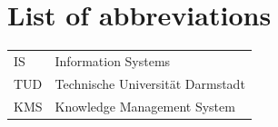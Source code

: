 \documentclass[
	english,
	ruledheaders=section,%
	class=report,%
	thesis={type=bachelor},%
	accentcolor=1b,%
	custommargins=true,%
	marginpar=false,%
	parskip=half-,%
	fontsize=11pt,%
	DIV=14,
]{tudapub}
\begin{document}
\listoftables
{}           %

\chapter*{List of abbreviations}

\begin{xtabular}{ll}
IS					&	Information Systems\\
TUD					&	Technische Universität Darmstadt\\
KMS                 &   Knowledge Management System \\

\end{xtabular} 


\onehalfspacing
\setcounter{seitenzahlroemisch}{\value{page}}
\end{document}
